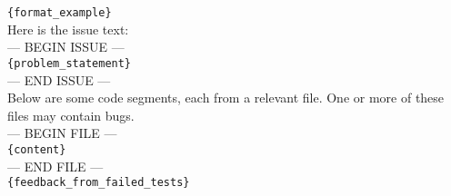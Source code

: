 \begin{tcolorbox}[colback=white, colframe=black]
\texttt{\{format\_example\}}\\

Here is the issue text:\\
--- BEGIN ISSUE ---\\
\texttt{\{problem\_statement\}}\\
--- END ISSUE ---\\

Below are some code segments, each from a relevant file. One or more of these files may contain bugs.\\
--- BEGIN FILE ---\\
\texttt{\{content\}}\\
--- END FILE ---\\

\texttt{\{feedback\_from\_failed\_tests\}}\\
\end{tcolorbox}


